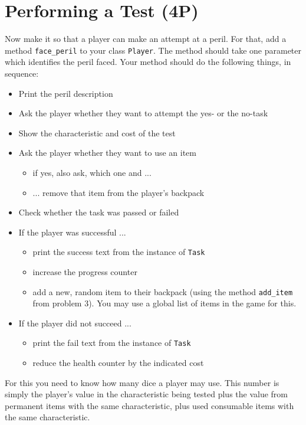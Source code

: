 \documentclass[
	english,
	fontsize=10pt,
	parskip=half,
	titlepage=true,
	DIV=12
]{scrartcl}
\begin{document}
\section{Performing a Test (4\;P)}
Now make it so that a player can make an attempt at a peril. For that, add a method \texttt{face\_peril} to your class \texttt{Player}. The method should take one parameter which identifies the peril faced. Your method should do the following things, in sequence:
\begin{itemize}
\item Print the peril description
\item Ask the player whether they want to attempt the yes- or the no-task
\item Show the characteristic and cost of the test
\item Ask the player whether they want to use an item
	\begin{itemize}
	\item if yes, also ask, which one and ...
	\item ... remove that item from the player's backpack
	\end{itemize}
\item Check whether the task was passed or failed
\item If the player was successful ...
	\begin{itemize}
	\item print the success text from the instance of \texttt{Task}
	\item increase the progress counter
	\item add a new, random item to their backpack (using the method \texttt{add\_item} from problem 3). You may use a global list of items in the game for this.
	\end{itemize}
\item If the player did not succeed ...
	\begin{itemize}
	\item print the fail text from the instance of \texttt{Task}
	\item reduce the health counter by the indicated cost
	\end{itemize}
\end{itemize}

For this you need to know how many dice a player may use. This number is simply the player's value in the characteristic being tested plus the value from permanent items with the same characteristic, plus used consumable items with the same characteristic.
\end{document}

